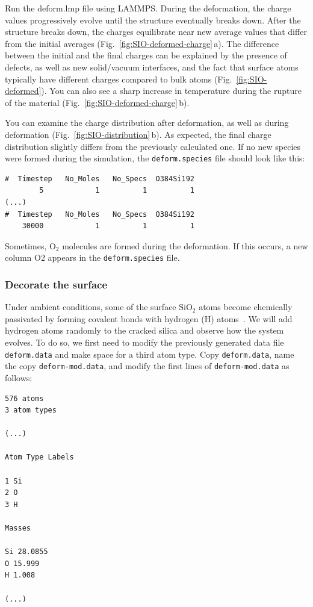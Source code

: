 \documentclass[9pt,tutorial]{livecoms}
\newcommand{\lmpcmd}[1]{\hspace{0pt}\colorbox{listing}{\textcolor{command}{\small{#1}}}\hspace{0pt}} %
\newcommand{\flecmd}[1]{\textcolor{command}{\texttt{#1}}} %
\begin{document}
Run the \lmpcmd{deform.lmp} file using LAMMPS.  During the deformation, the charge
values progressively evolve until the structure eventually breaks down.  After the
structure breaks down, the charges equilibrate near new average values that differ
from the initial averages (Fig.~\ref{fig:SIO-deformed-charge}\,a).  The difference
between the initial and the final charges can be explained by the presence of
defects, as well as new solid/vacuum interfaces, and the fact that surface atoms
typically have different charges compared to bulk atoms (Fig.~\ref{fig:SIO-deformed}).
You can also see a sharp increase in temperature during the rupture of
the material (Fig.~\ref{fig:SIO-deformed-charge}\,b).

You can examine the charge distribution after deformation, as well as during
deformation (Fig.~\ref{fig:SIO-distribution}\,b).  As expected, the final
charge distribution slightly differs from the previously calculated one.  If
no new species were formed during the simulation, the \flecmd{deform.species} file
should look like this:
\begin{lstlisting}
#  Timestep   No_Moles   No_Specs  O384Si192
        5            1          1          1
(...)
#  Timestep   No_Moles   No_Specs  O384Si192
    30000            1          1          1
\end{lstlisting}
Sometimes, $\text{O}_2$ molecules are formed during the deformation.  If this occurs,
a new column \lmpcmd{O2} appears in the \flecmd{deform.species} file.

\subsubsection{Decorate the surface}

Under ambient conditions, some of the surface $\text{SiO}_2$ atoms become chemically
passivated by forming covalent bonds with hydrogen (H) atoms~\cite{sulpizi2012silica}.
We will add hydrogen atoms randomly to the cracked silica and observe how the
system evolves.  To do so, we first need to modify the previously generated data
file \flecmd{deform.data} and make space for a third atom type.
Copy \flecmd{deform.data}, name the copy \flecmd{deform-mod.data}, and modify the
first lines of \flecmd{deform-mod.data} as follows:
\begin{lstlisting}
576 atoms
3 atom types

(...)

Atom Type Labels

1 Si
2 O
3 H

Masses

Si 28.0855
O 15.999
H 1.008

(...)
\end{lstlisting}
\end{document}
